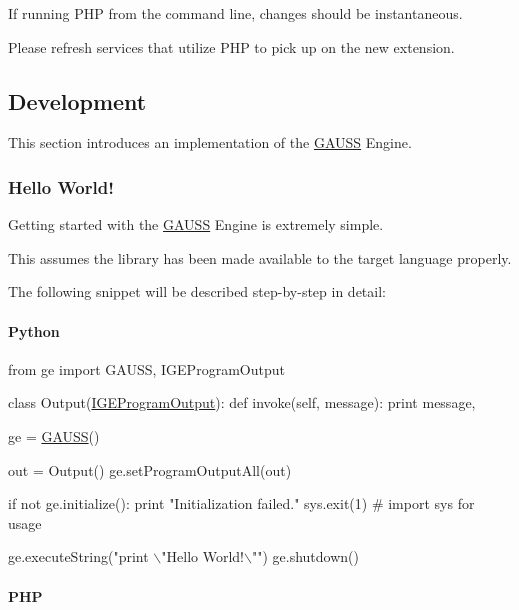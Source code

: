 If running P\+HP from the command line, changes should be instantaneous.

Please refresh services that utilize P\+HP to pick up on the new extension.

\subsection*{Development}

This section introduces an implementation of the \hyperlink{class_g_a_u_s_s}{G\+A\+U\+SS} Engine.

\subsubsection*{Hello World!}

Getting started with the \hyperlink{class_g_a_u_s_s}{G\+A\+U\+SS} Engine is extremely simple.

This assumes the library has been made available to the target language properly.

The following snippet will be described step-\/by-\/step in detail\+:

\paragraph*{Python}


\begin{DoxyCode}
\textcolor{keyword}{from} ge \textcolor{keyword}{import} GAUSS, IGEProgramOutput

\textcolor{keyword}{class }Output(\hyperlink{class_i_g_e_program_output}{IGEProgramOutput}):
    \textcolor{keyword}{def }invoke(self, message):
        \textcolor{keywordflow}{print} message,

ge = \hyperlink{class_g_a_u_s_s}{GAUSS}()

out = Output()
ge.setProgramOutputAll(out)

\textcolor{keywordflow}{if} \textcolor{keywordflow}{not} ge.initialize():
    \textcolor{keywordflow}{print} \textcolor{stringliteral}{"Initialization failed."}
    sys.exit(1)     \textcolor{comment}{# import sys for usage}

ge.executeString(\textcolor{stringliteral}{"print \(\backslash\)"Hello World!\(\backslash\)""})
ge.shutdown()
\end{DoxyCode}


\paragraph*{P\+HP}


